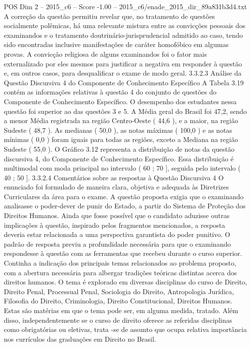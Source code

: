 \begin{textsample}{POS Dim 2 – 2015\_c6 – Score -1.00 – 2015\_c6/enade\_2015\_dir\_89a831b3d4.txt}
A correção da questão permitiu revelar que, no tratamento de questões socialmente polêmicas, há uma relevante mistura entre as convicções pessoais dos examinandos e o tratamento doutrinário-jurisprudencial admitido ao caso, tendo sido encontradas inclusive manifestações de caráter homofóbico em algumas provas.
A convicção religiosa de alguns examinandos foi o fator mais externalizado por eles mesmos para justificar a negativa em responder à questão e, em outros casos, para desqualificar o exame de modo geral. 3.3.2.3 Análise da Questão Discursiva 4 do Componente de Conhecimento Específico A Tabela 3.19 contém as informações relativas à questão 4 do conjunto de questões do Componente de Conhecimento Específico.
O desempenho dos estudantes nessa questão foi superior ao das questões 3 e 5.
A Média geral do Brasil foi 47,2, sendo a menor Média registrada na região Centro-Oeste ( 44,6 ), e a maior, na região Sudeste ( 48,7 ).
As medianas ( 50,0 ), as notas máximas ( 100,0 ) e as notas mínimas ( 0,0 ) foram iguais para todas as regiões, exceto a Mediana na região Sudeste ( 55,0 ).
O Gráfico 3.12 representa a distribuição de notas da questão discursiva 4, do Componente de Conhecimento Específico.
Essa distribuição é multimodal com moda principal no intervalo ( 60 ; 70 ], seguida pelo intervalo ( 40 ; 50 ]. 3.3.2.4 Comentários sobre as respostas à Questão Discursiva 4 O enunciado foi formulado de maneira clara, objetiva e adequada às Diretrizes Curriculares da área para o exame.
A questão proposta exigia que o examinando analisasse o poder-dever de punir do Estado, a partir do Sistema de Proteção dos Direitos Humanos.
Ainda que fosse possível que o candidato aduzisse outras implicações à questão, inspirado pelos fragmentos mencionados, a resposta deveria estar relacionada a uma perspectiva garantista do poder punitivo.
O padrão de resposta previu a profundidade necessária para que o examinando respondesse à questão com as ferramentas que recebeu durante o curso superior.
Continha a indicação dos principais temas relacionados ao problema proposto, com a abertura necessária para albergar tradições teóricas distintas acerca dos direitos humanos.
O tema é explorado em diversas disciplinas do curso de Direito, Direito Penal, Processual Penal, Sociologia do Direito, Antropologia Jurídica, Filosofia do Direito, Criminologia, Direito Constitucional, Direitos Humanos.
Estas são matérias em que o tema pode ser, em alguma medida, tratado.
Além disso, independentemente se o curso de direito oferece as referidas disciplinas como obrigatórias ou eletivas, trata -se de assunto que ocupa relativa importância nos currículos das graduações em Direito no Brasil.

\end{textsample}
